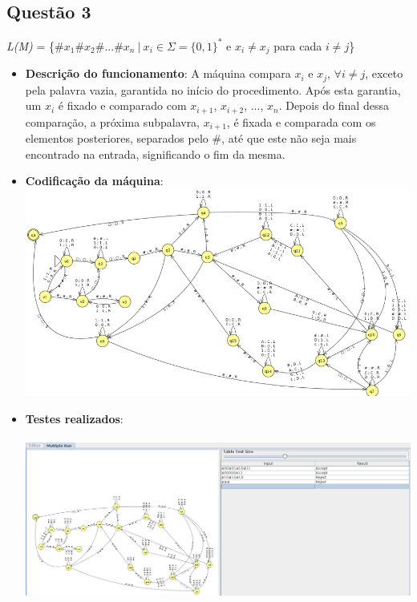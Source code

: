 \documentclass{article}
\begin{document}
\subsection*{Questão 3}
\textit{L(M)} = \{$\#x_{1}\#x_{2}\#...\#x_{n}\  \vert\  x_{i} \in \Sigma =
\{0,1\}^{*}$ e $x_{i} \neq x_{j}$ para cada $i \neq j$\}
\begin{itemize}
    \item \textbf{Descrição do funcionamento}: A máquina compara $x_i$ e $x_j$,
    $\forall i\neq j$, exceto pela palavra vazia, garantida no início do
    procedimento. Após esta garantia, um $x_i$ é fixado e comparado com
    $x_{i+1}$, $x_{i+2}$, ..., $x_n$. Depois do final dessa comparação, a
    próxima subpalavra, $x_{i+1}$, é fixada e comparada com os elementos
    posteriores, separados pelo \#, até que este não seja mais encontrado na
    entrada, significando o fim da mesma.
    \item \textbf{Codificação da máquina}: \\
    \includegraphics[width=\textwidth]{questao3_ss.png}
    \item \textbf{Testes realizados}: \\ \\
    \includegraphics[width=\textwidth]{questao3_inputs.png}
\end{itemize}
\end{document}
